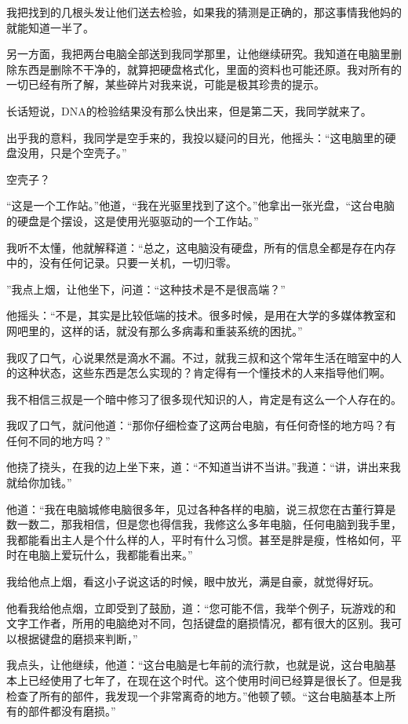 我把找到的几根头发让他们送去检验，如果我的猜测是正确的，那这事情我他妈的就能知道一半了。

另一方面，我把两台电脑全部送到我同学那里，让他继续研究。我知道在电脑里删除东西是删除不干净的，就算把硬盘格式化，里面的资料也可能还原。我对所有的一切已经有所了解，某些碎片对我来说，可能是极其珍贵的提示。

长话短说，DNA的检验结果没有那么快出来，但是第二天，我同学就来了。

出乎我的意料，我同学是空手来的，我投以疑问的目光，他摇头：“这电脑里的硬盘没用，只是个空壳子。”

空壳子？

“这是一个工作站。”他道，“我在光驱里找到了这个。”他拿出一张光盘，“这台电脑的硬盘是个摆设，这是使用光驱驱动的一个工作站。”

我听不太懂，他就解释道：“总之，这电脑没有硬盘，所有的信息全都是存在内存中的，没有任何记录。只要一关机，一切归零。

”我点上烟，让他坐下，问道：“这种技术是不是很高端？”

他摇头：“不是，其实是比较低端的技术。很多时候，是用在大学的多媒体教室和网吧里的，这样的话，就没有那么多病毒和重装系统的困扰。”

我叹了口气，心说果然是滴水不漏。不过，就我三叔和这个常年生活在暗室中的人的这种状态，这些东西是怎么实现的？肯定得有一个懂技术的人来指导他们啊。

我不相信三叔是一个暗中修习了很多现代知识的人，肯定是有这么一个人存在的。

我叹了口气，就问他道：“那你仔细检查了这两台电脑，有任何奇怪的地方吗？有任何不同的地方吗？”

他挠了挠头，在我的边上坐下来，道：“不知道当讲不当讲。”我道：“讲，讲出来我就给你加钱。”

他道：“我在电脑城修电脑很多年，见过各种各样的电脑，说三叔您在古董行算是数一数二，那我相信，但是您也得信我，我修这么多年电脑，任何电脑到我手里，我都能看出主人是个什么样的人，平时有什么习惯。甚至是胖是瘦，性格如何，平时在电脑上爱玩什么，我都能看出来。”

我给他点上烟，看这小子说这话的时候，眼中放光，满是自豪，就觉得好玩。

他看我给他点烟，立即受到了鼓励，道：“您可能不信，我举个例子，玩游戏的和文字工作者，所用的电脑绝对不同，包括键盘的磨损情况，都有很大的区别。我可以根据键盘的磨损来判断，”

我点头，让他继续，他道：“这台电脑是七年前的流行款，也就是说，这台电脑基本上已经使用了七年了，在现在这个时代。这个使用时间已经算是很长了。但是我检查了所有的部件，我发现一个非常离奇的地方。”他顿了顿。“这台电脑基本上所有的部件都没有磨损。”

